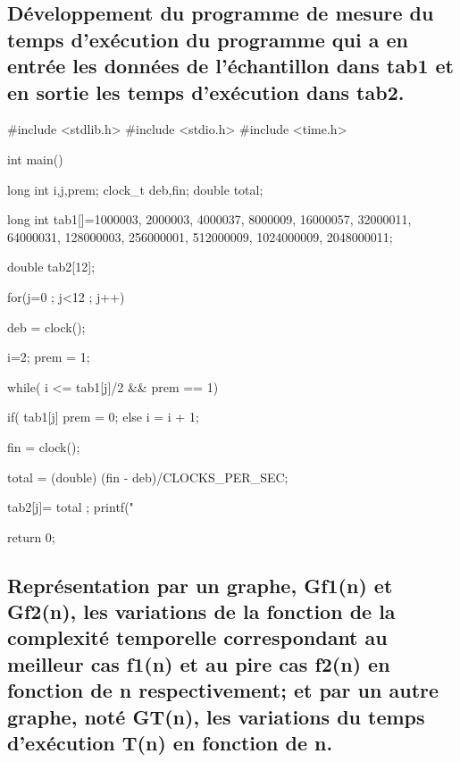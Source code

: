 \documentclass[12pt]{article}
\begin{document}
\subsection{Développement du programme de mesure du temps d'exécution du programme qui a en entrée les données de l'échantillon dans tab1 et en sortie les temps d'exécution dans tab2. }
\begin{sql}
#include <stdlib.h>
#include <stdio.h>
#include <time.h>

int main()
{
	long int i,j,prem;
	clock_t deb,fin;
	double total;

	long int tab1[]={1000003, 2000003,	4000037,	8000009,	16000057,	32000011,	64000031,
	128000003,	256000001,	512000009,	1024000009,	2048000011};

	double tab2[12];

for(j=0 ; j<12 ; j++)
{
	deb = clock();
	
	i=2;
	prem = 1;

	while( i <= tab1[j]/2 && prem == 1){

		if( tab1[j]%
			prem = 0;
		else
			i = i + 1;
	}
	fin = clock();

	total = (double) (fin - deb)/CLOCKS_PER_SEC;
	
	tab2[j]= total ;
	printf("%
}
return 0;

}
\end{sql}

\subsection{Représentation par un graphe, Gf1(n) et Gf2(n), les variations de la fonction de la complexité temporelle correspondant au meilleur cas f1(n) et au pire cas f2(n) en fonction de n respectivement; et par un autre graphe, noté GT(n), les variations  du temps d'exécution T(n) en fonction de n.}
\end{document}
